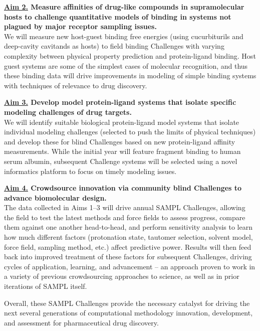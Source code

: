 \documentclass[11pt]{article}
\begin{document}
{\bf \underline{Aim 2.} Measure affinities of drug-like compounds in supramolecular hosts to challenge quantitative models of binding in systems not plagued by major receptor sampling issues.}\\
We will measure new host-guest binding free energies (using cucurbiturils and deep-cavity cavitands as hosts) to field binding Challenges with varying complexity between physical property prediction and protein-ligand binding. 
Host guest systems are some of the simplest cases of molecular recognition, and thus these binding data will drive improvements in modeling of simple binding systems with techniques of relevance to drug discovery.

{\bf \underline{Aim 3.} Develop model protein-ligand systems that isolate specific modeling challenges of drug targets.}\\
We will identify suitable biological protein-ligand model systems that isolate individual modeling challenges (selected to push the limits of physical techniques) and develop these for blind Challenges based on new protein-ligand affinity measurements.
While the initial year will feature fragment binding to human serum albumin, subsequent Challenge systems will be selected using a novel informatics platform to focus on timely modeling issues.

{\bf \underline{Aim 4.} Crowdsource innovation via community blind Challenges to advance biomolecular design.} \\
The data collected in Aims 1--3 will drive annual SAMPL Challenges, allowing the field to test the latest methods and force fields to assess progress, compare them against one another head-to-head, and perform sensitivity analysis to learn how much different factors (protonation state, tautomer selection, solvent model, force field, sampling method, etc.) affect predictive power. 
Results will then feed back into improved treatment of these factors for subsequent Challenges, driving cycles of application, learning, and advancement -- an approach proven to work in a variety of previous crowdsourcing approaches to science, as well as in prior iterations of SAMPL itself.

Overall, these SAMPL Challenges provide the necessary catalyst for driving the next several generations of computational methodology innovation, development, and assessment for pharmaceutical drug discovery. 


\end{document}
